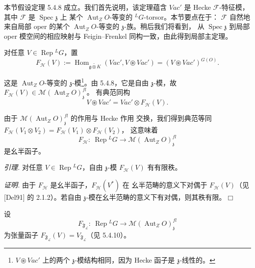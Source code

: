 
本节假设定理 5.4.8 成立。我们首先说明，该定理蕴含 $\mathit{Vac}'$ 是 Hecke
$\mathcal{F}$-特征模，其中 $\mathcal{F}$ 是 $\operatorname{Spec}\mathfrak{z}$ 上
某个 $\operatorname{Aut}_ZO$-等变的 ${}^{L}G$-torsor。本节要点在于：
$\mathcal{F}$ 自然地来自局部 oper 的某个 $\operatorname{Aut}_ZO$-等变的
$\mathfrak{z}$-族。稍后我们将看到，
从 $\operatorname{Spec}\mathfrak{z}$ 到局部 oper 模空间的相应映射与
Feigin--Frenkel 同构一致，由此得到局部主定理。

 对任意 $V\in\operatorname{Rep}{}^{L}G$，置
\begin{equation}\tag{284}
F_{\mathcal{H}}(V):=\operatorname{Hom}_{\widetilde{\mathfrak{g}\otimes K}}
(\mathit{Vac}',V\circledast\mathit{Vac}')=(V\circledast\mathit{Vac}')^{G(O)}.
\end{equation}

这是 $\operatorname{Aut}_ZO$-等变的 $\mathfrak{z}$-模\footnote{$V\circledast
\mathit{Vac}'$ 上的两个 $\mathfrak{z}$-模结构相同，因为 Hecke 函子是
$\mathfrak{z}$-线性的。}。由 5.4.8，它是自由 $\mathfrak{z}$-模，故
$F_{\mathcal{H}}(V)\in\mathcal{M}(\operatorname{Aut}_ZO)^{fl}_{\mathfrak{z}}$。
有典范同构
\begin{equation}\tag{285}
V\circledast\mathit{Vac}'=\mathit{Vac}'\otimes F_{\mathcal{H}}(V).
\end{equation}

由于 $\mathcal{M}(\operatorname{Aut}_ZO)^{fl}_{\mathfrak{z}}$ 的作用与 Hecke 作用
交换，我们得到典范等同
$F_{\mathcal{H}}(V_1\otimes V_2)=F_{\mathcal{H}}(V_1)\otimes F_{\mathcal{H}}(V_2)$，
这意味着
\begin{equation}\tag{286}
F_{\mathcal{H}}:\ \operatorname{Rep}{}^{L}G\to
\mathcal{M}(\operatorname{Aut}_ZO)^{fl}_{\mathfrak{z}}
\end{equation}
是幺半函子。

 \emph{引理.} 对任意 $V\in\operatorname{Rep}{}^{L}G$，自由
$\mathfrak{z}$-模 $F_{\mathcal{H}}(V)$ 有有限秩。

\emph{证明.} 由于 $F_{\mathcal{H}}$ 是幺半函子，$F_{\mathcal{H}}(V^{*})$ 在
幺半范畴的意义下对偶于 $F_{\mathcal{H}}(V)$（见 [Del91] 的 2.1.2）。若自由
$\mathfrak{z}$-模在幺半范畴的意义下有对偶，则其秩有限。\hfill$\Box$


设
\begin{equation}\tag{287}
F_{\mathfrak{F}_{\mathcal{L}}}:\ \operatorname{Rep}{}^{L}G\to
\mathcal{M}(\operatorname{Aut}_ZO)^{fl}_{\mathfrak{z}}
\end{equation}
为张量函子
$F_{\mathfrak{F}_{\mathcal{L}}}(V)=V_{\mathfrak{F}_{\mathcal{L}}}$（见 5.4.10）。


